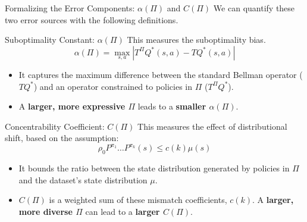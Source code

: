 \documentclass[11pt]{beamer}
\newcommand{\tb}[1]{\textbf{#1}}
\begin{document}
\begin{frame}{Formalizing the Error Components: $\alpha(\Pi)$ and $C(\Pi)$}
    We can quantify these two error sources with the following definitions.

    \begin{block}{Suboptimality Constant: $\alpha(\Pi)$}
        This measures the suboptimality bias.
        \[ \alpha(\Pi) = \max_{s,a} |T^\Pi Q^*(s,a) - TQ^*(s,a)| \]
        \begin{itemize}
            \item It captures the maximum difference between the standard Bellman operator ($TQ^*$) and an operator constrained to policies in $\Pi$ ($T^\Pi Q^*$).
            \item A \tb{larger, more expressive $\Pi$} leads to a \tb{smaller $\alpha(\Pi)$}.
        \end{itemize}
    \end{block}

    \begin{block}{Concentrability Coefficient: $C(\Pi)$}
        This measures the effect of distributional shift, based on the assumption:
        \[ \rho_0 P^{\pi_1} \dots P^{\pi_k}(s) \le c(k) \mu(s) \]
        \begin{itemize}
            \item It bounds the ratio between the state distribution generated by policies in $\Pi$ and the dataset's state distribution $\mu$.
            \item $C(\Pi)$ is a weighted sum of these mismatch coefficients, $c(k)$. A \tb{larger, more diverse $\Pi$} can lead to a \tb{larger $C(\Pi)$}.
        \end{itemize}
    \end{block}
\end{frame}
\end{document}
